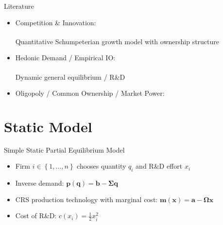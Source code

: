 \documentclass[
  aspectratio=169,  %
]{beamer}
\theoremstyle{plain}
\begin{document}
\begin{frame}{Literature}
  \begin{itemize}
    \item Competition \& Innovation: \\
          {\footnotesize\citet{d-Aspremont1988-je,Aghion2001-yc,Aghion2005-vw,Acemoglu2012-bj,Aghion2013-nq,Bloom2013-pn,Lopez2019-sl,Peters2020-sd,Akcigit2021-ns,Akcigit2023-zl,Liu2022-iw,Cavenaile2023-lo,Anton2023-ej,Anton2024-pw,Kini2024-kd,Hopenhayn2024-ya}}\\
          \textcolor{uclaBlue}{Quantitative Schumpeterian growth model with ownership structure}\\
    \item Hedonic Demand / Empirical IO: \\
          {\footnotesize\citet{Lancaster1966-sg,Rosen1974-ep,Berry1995-lx,Nevo2001-ja,Pellegrino2024-dn,Ederer2024-rw}}\\
          \textcolor{uclaBlue}{Dynamic general equilibrium / R\&D}
    \item Oligopoly / Common Ownership / Market Power: \\
          {\footnotesize\citet{Rubinstein1983-pi,Rotemberg1984-jz,Neary2003-sn,Atkeson2008-zc,Gutierrez2017-wl,He2017-ix,Azar2018-cc,Azar2022-cn,Autor2020-mr,Baqaee2020-eb,De_Loecker2020-jn,Azar2021-uh,Edmond2023-bg}}
  \end{itemize}
\end{frame}

\section{Static Model}

\begin{frame}{Simple Static Partial Equilibrium Model}
  \begin{itemize}
    \item Firm $i\in \left\{1,\ldots, n\right\}$ chooses quantity $q_i$ and R\&D effort $x_i$
          \medskip{}
    \item Inverse demand: $\symbf{p}(\symbf{q}) = \symbf{b} - \symbf{\Sigma} \symbf{q}$\medskip{}
    \item CRS production technology with marginal cost: $\symbf{m}(\symbf{x}) = \symbf{a} - \symbf{\Omega} \symbf{x}$\medskip{}
    \item Cost of R\&D: $c(x_i) = \frac{1}{2}x_i^2$
  \end{itemize}
\end{frame}
\end{document}
